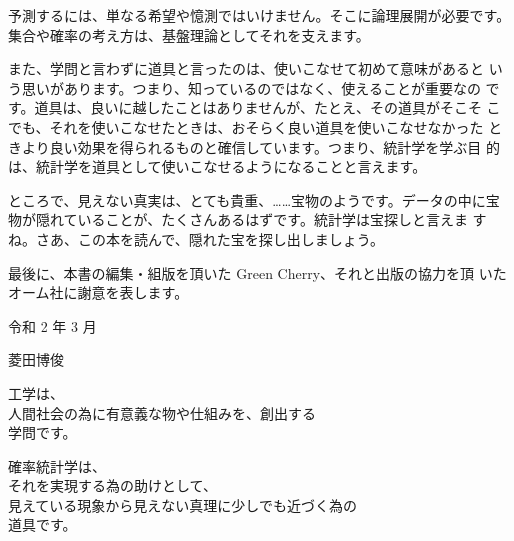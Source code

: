 予測するには、単なる希望や憶測ではいけません。そこに論理展開が必要です。集合や確率の考え方は、基盤理論としてそれを支えます。 

また、学問と言わずに道具と言ったのは、使いこなせて初めて意味があると いう思いがあります。つまり、知っているのではなく、使えることが重要なの です。道具は、良いに越したことはありませんが、たとえ、その道具がそこそ こでも、それを使いこなせたときは、おそらく良い道具を使いこなせなかった ときより良い効果を得られるものと確信しています。つまり、統計学を学ぶ目 的は、統計学を道具として使いこなせるようになることと言えます。 

ところで、見えない真実は、とても貴重、……宝物のようです。データの中に宝物が隠れていることが、たくさんあるはずです。統計学は宝探しと言えま すね。さあ、この本を読んで、隠れた宝を探し出しましょう。

\bigskip

最後に、本書の編集・組版を頂いた Green Cherry、それと出版の協力を頂 いたオーム社に謝意を表します。

\bigskip

{\small 令和 2 年 3 月}

\begin{flushright}
    \large 菱田\quad 博俊
\end{flushright}

\begin{adjustwidth}{1.5em}{0pt}
    \small\sffamily
    工学は、\\
    \mbox{\quad}人間社会の為に有意義な物や仕組みを、創出する\\
    \mbox{\qquad}学問です。 
    
    \bigskip
    
    \noindent 確率統計学は、\\
    \mbox{\quad}それを実現する為の助けとして、\\
    \mbox{\qquad}見えている現象から見えない真理に少しでも近づく為の\\\mbox{\quad\qquad}道具です。
\end{adjustwidth}